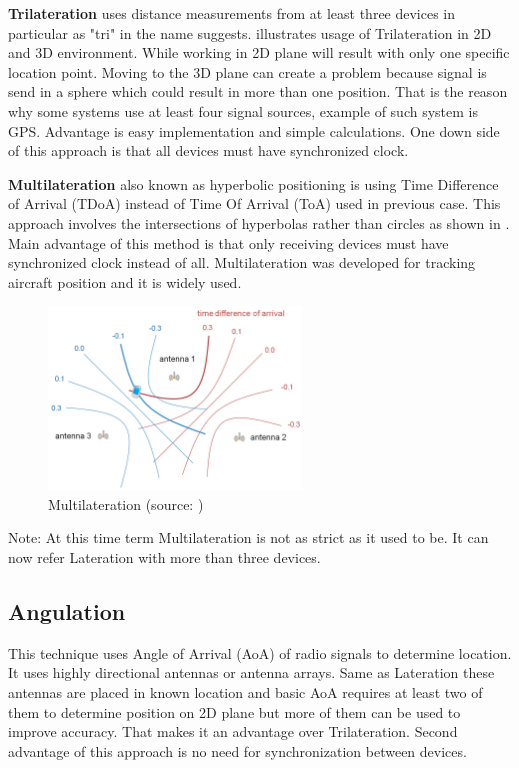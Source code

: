 \textbf{Trilateration} uses distance measurements from at least three devices in particular as "tri" in the name suggests.\cite{RAinWILTaS}  illustrates usage of Trilateration in 2D and 3D environment. While working in 2D plane will result with only one specific location point. Moving to the 3D plane can create a problem because signal is send in a sphere which could result in more than one position. That is the reason why some systems use at least four signal sources, example of such system is GPS.\cite{GNSSGPS} Advantage is easy implementation and simple calculations. One down side of this approach is that all devices must have synchronized clock.\cite{RAinWILTaS}

\textbf{Multilateration} also known as hyperbolic positioning is using Time Difference of Arrival (TDoA) instead of Time Of Arrival (ToA) used in previous case. This approach involves the intersections of hyperbolas rather than circles as shown in . Main advantage of this method is that only receiving devices must have synchronized clock instead of all.\cite{PLTaA} Multilateration was developed for tracking aircraft position and it is widely used.

\begin{figure}[h!]
	\begin{centering}
		\includegraphics[width=0.6\textwidth]{img/multilateration}
		\par\end{centering}
	\caption{Multilateration (source: \cite{HPwAA})\label{fig:Multilateration}}
	\label{fig3}
\end{figure}

Note: At this time term Multilateration is not as strict as it used to be. It can now refer Lateration with more than three devices.

\subsection{Angulation}\label{sec:Angulation}
This technique uses Angle of Arrival (AoA) of radio signals to determine location. It uses highly directional antennas or antenna arrays. Same as Lateration these antennas are placed in known location and basic AoA requires at least two of them to determine position on 2D plane but more of them can be used to improve accuracy.\cite{RAinWILTaS} That makes it an advantage over Trilateration. Second advantage of this approach is no need for synchronization between devices.


